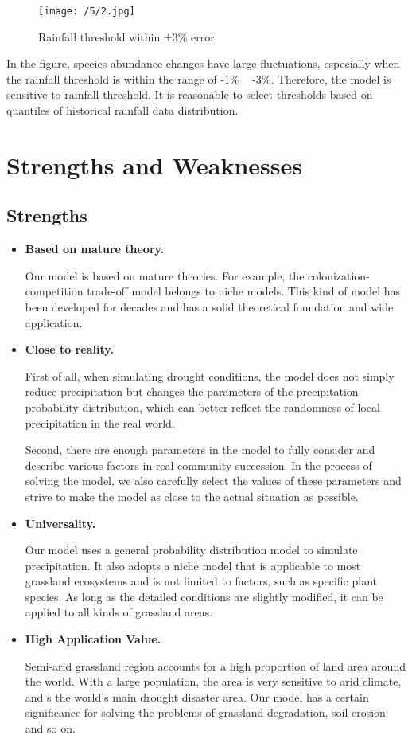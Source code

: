 \documentclass{mcmthesis}
\begin{document}
\begin{figure}[h]\label{5.2}
	\centering
	\texttt{[image: /5/2.jpg]}
	\caption{Rainfall threshold within ±3\% error} 
\end{figure}

In the figure, species abundance changes have large fluctuations, especially when the rainfall threshold is within the range of -1\% ~ -3\%. Therefore, the model is sensitive to  rainfall threshold. It is reasonable to select thresholds based on quantiles of historical rainfall data distribution.

\section{Strengths and Weaknesses}

\subsection{Strengths}

\begin{itemize}
	\item \textbf{Based on mature theory.}\,
	
	Our model is based on mature theories. For example, the colonization-competition trade-off model belongs to niche models. This kind of model has been developed for decades and has a solid theoretical foundation and wide application.
	
	\item \textbf{Close to reality.}\,
	
	First of all, when simulating drought conditions, the model does not simply reduce precipitation but changes the parameters of the precipitation probability distribution, which can better reflect the randomness of local precipitation in the real world. 
	
	Second, there are enough parameters in the model to fully consider and describe various factors in real community succession. In the process of solving the model, we also carefully select the values of these parameters and strive to make the model as close to the actual situation as possible.
	
	\item \textbf{Universality. }\,
	
	Our model uses a general probability distribution model to simulate precipitation. It also adopts a niche model that is applicable to most grassland ecosystems and is not limited to factors, such as specific plant species. As long as the detailed conditions are slightly modified, it can be applied to all kinds of grassland areas.
	
	\item \textbf{High Application Value.}\,
	
	Semi-arid grassland region accounts for a high proportion of land area around the world. With a large population, the area is very sensitive to arid climate, and s the world’s main drought disaster area. Our model has a certain significance for solving the problems of grassland degradation, soil erosion and so on.
\end{itemize}
\end{document}
